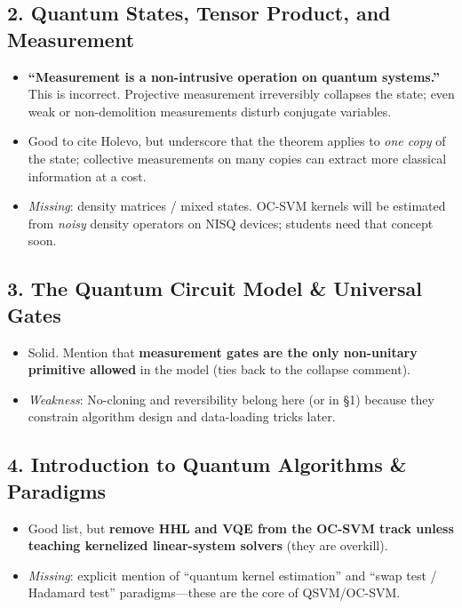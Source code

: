 \documentclass[11pt,a4paper]{article}
\begin{document}
	\subsection{2. Quantum States, Tensor Product, and Measurement}
	\begin{itemize}
		\item \textbf{“Measurement is a non-intrusive operation on quantum systems.”} This is incorrect. Projective measurement irreversibly collapses the state; even weak or non-demolition measurements disturb conjugate variables.
		\item Good to cite Holevo, but underscore that the theorem applies to \textit{one copy} of the state; collective measurements on many copies can extract more classical information at a cost.
		\item \textit{Missing}: density matrices / mixed states. OC-SVM kernels will be estimated from \textit{noisy} density operators on NISQ devices; students need that concept soon.
	\end{itemize}
	
	\subsection{3. The Quantum Circuit Model \& Universal Gates}
	\begin{itemize}
		\item Solid. Mention that \textbf{measurement gates are the only non-unitary primitive allowed} in the model (ties back to the collapse comment).
		\item \textit{Weakness}: No-cloning and reversibility belong here (or in §1) because they constrain algorithm design and data-loading tricks later.
	\end{itemize}
	
	\subsection{4. Introduction to Quantum Algorithms \& Paradigms}
	\begin{itemize}
		\item Good list, but \textbf{remove HHL and VQE from the OC-SVM track unless teaching kernelized linear-system solvers} (they are overkill).
		\item \textit{Missing}: explicit mention of “quantum kernel estimation” and “swap test / Hadamard test” paradigms—these are the core of QSVM/OC-SVM.
	\end{itemize}
	
\end{document}
